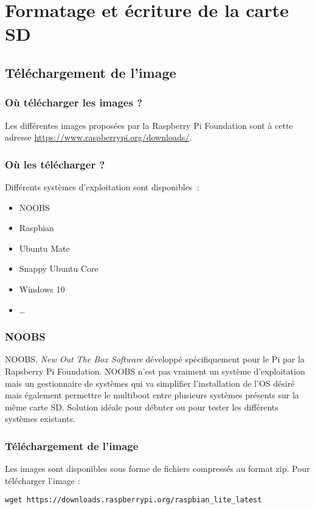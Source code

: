 \section{Formatage et écriture de la carte SD}

\subsection{Téléchargement de l'image}

\begin{frame}
\frametitle{Où télécharger les images ?}

Les différentes images proposées par la Raspberry Pi Foundation sont à cette adresse \href{https://www.raspberrypi.org/downloads/}{https://www.raspberrypi.org/downloads/}.
\end{frame}

\begin{frame}[containsverbatim]
\frametitle{Où les télécharger ?}

Différents systèmes d'exploitation sont disponibles~:
\begin{itemize}
	\item NOOBS
	\item Raspbian
	\item Ubuntu Mate
	\item Snappy Ubuntu Core
	\item Windows 10
	\item \dots
\end{itemize}
\end{frame}

\begin{frame}[containsverbatim]
\frametitle{NOOBS}

NOOBS, \emph{New Out The Box Software} développé spécifiquement pour le Pi par la Rapsberry Pi Foundation. NOOBS n'est pas vraiment un système d'exploitation mais un gestionnaire de systèmes qui va simplifier l'installation de l'OS désiré mais également permettre le multiboot entre plusieurs systèmes présents sur la même carte SD. Solution idéale pour débuter ou pour tester les différents systèmes
existants.

\end{frame}



\begin{frame}[containsverbatim]
\frametitle{Téléchargement de l'image}

Les images sont disponibles sous forme de fichiers compressés au format zip. Pour télécharger l'image :
\begin{verbatim}
wget https://downloads.raspberrypi.org/raspbian_lite_latest
\end{verbatim}

\end{frame}

